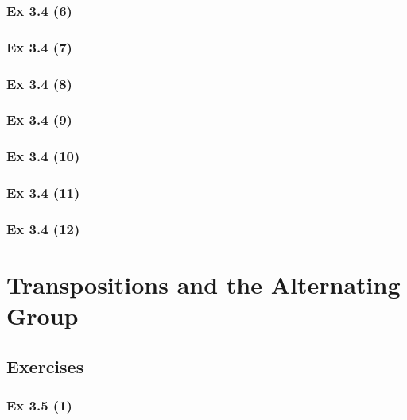 \subsubsection{Ex 3.4 (6)}\label{sec:Ex_3.4.6}

\subsubsection{Ex 3.4 (7)}\label{sec:Ex_3.4.7}

\subsubsection{Ex 3.4 (8)}\label{sec:Ex_3.4.8}

\subsubsection{Ex 3.4 (9)}\label{sec:Ex_3.4.9}

\subsubsection{Ex 3.4 (10)}\label{sec:Ex_3.4.10}

\subsubsection{Ex 3.4 (11)}\label{sec:Ex_3.4.11}

\subsubsection{Ex 3.4 (12)}\label{sec:Ex_3.4.12}

\newpage		%

\section{Transpositions and the Alternating Group}\label{sec:3.5}	
\subsection*{Exercises}\label{sec:3.5_Exercises}

\subsubsection{Ex 3.5 (1)}\label{sec:Ex_3.5.1}


